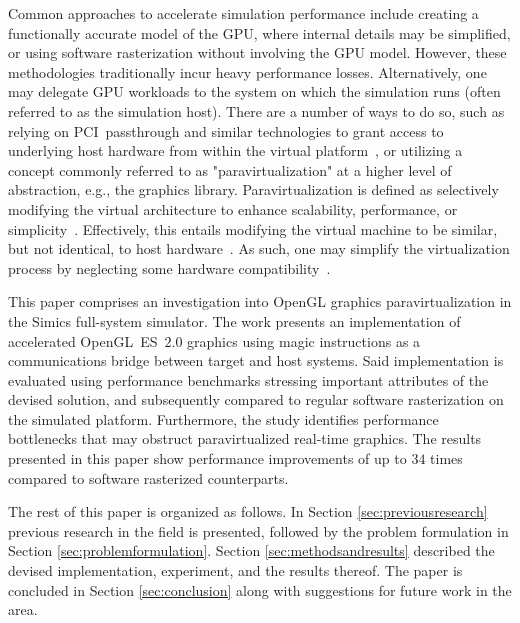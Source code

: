 Common approaches to accelerate simulation performance include creating a functionally accurate model of the GPU, where internal details may be simplified, or using software rasterization without involving the GPU model.
However, these methodologies traditionally incur heavy performance losses.
Alternatively, one may delegate GPU workloads to the system on which the simulation runs (often referred to as the simulation host).
There are a number of ways to do so, such as relying on PCI~passthrough and similar technologies to grant access to underlying host hardware from within the virtual platform~, or utilizing a concept commonly referred to as "paravirtualization" at a higher level of abstraction, e.g., the graphics library.
Paravirtualization is defined as selectively modifying the virtual architecture to enhance scalability, performance, or simplicity~.
Effectively, this entails modifying the virtual machine to be similar, but not identical, to host hardware~.
As such, one may simplify the virtualization process by neglecting some hardware compatibility~.

This paper comprises an investigation into OpenGL graphics paravirtualization in the Simics full-system simulator.
The work presents an implementation of accelerated OpenGL~ES~$2.0$ graphics using magic instructions as a communications bridge between target and host systems.
Said implementation is evaluated using performance benchmarks stressing important attributes of the devised solution, and subsequently compared to regular software rasterization on the simulated platform.
Furthermore, the study identifies performance bottlenecks that may obstruct paravirtualized real-time graphics.
The results presented in this paper show performance improvements of up to $34$ times compared to software rasterized counterparts.

The rest of this paper is organized as follows.
In Section \ref{sec:previousresearch} previous research in the field is presented, followed by the problem formulation in Section \ref{sec:problemformulation}.
Section \ref{sec:methodsandresults} described the devised implementation, experiment, and the results thereof.
The paper is concluded in Section \ref{sec:conclusion} along with suggestions for future work in the area.

